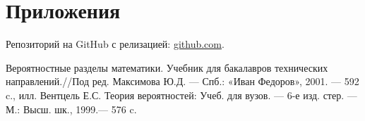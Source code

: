 \documentclass[12pt,a4paper]{scrartcl}
\begin{document}
\section{Приложения}
Репозиторий на GitHub с релизацией: \href{https://github.com/WiillyWonka/MatStat}{github.com}.

\begin{thebibliography}{99}
		    Вероятностные разделы математики. Учебник для бакалавров технических направлений.//Под ред. Максимова Ю.Д. — Спб.: «Иван Федоров», 2001. — 592 c., илл.
		   Вентцель Е.С. Теория вероятностей: Учеб. для вузов. — 6-е изд. стер. — М.: Высш. шк., 1999.— 576 c.
\end{thebibliography}
\end{document}
